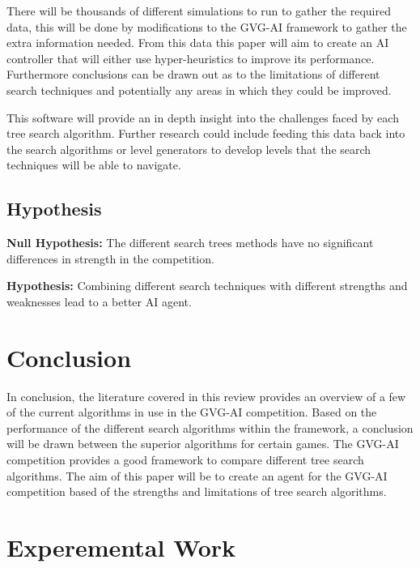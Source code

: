 \documentclass[journal]{IEEEtran}
\begin{document}
	There will be thousands of different simulations to run to gather the required data, this will be done by modifications to the GVG-AI framework to gather the extra information needed.
	From this data this paper will aim to create an AI controller that will either use hyper-heuristics to improve its performance. Furthermore conclusions can be drawn out as to the limitations of different search techniques and potentially any areas in which they could be improved.
	
	

	This software will provide an in depth insight into the challenges faced by each tree search algorithm.
	Further research could include feeding this data back into the search algorithms or level generators to develop levels that the search techniques will be able to navigate.

	
\subsection{Hypothesis}
	\textbf{Null Hypothesis:}
		The different search trees methods have no significant differences in strength in the competition.
		
	\textbf{Hypothesis:}
		Combining different search techniques with different strengths and weaknesses lead to a better AI agent.

\section{Conclusion}
	In conclusion, the literature covered in this review provides an overview of a few of the current algorithms in use in the GVG-AI competition.
	Based on the performance of the different search algorithms within the framework, a conclusion will be drawn between the superior algorithms for certain games.
	The GVG-AI competition provides a good framework to compare different tree search algorithms. 
	The aim of this paper will be to create an agent for the GVG-AI competition based of the strengths and limitations of tree search algorithms.








\section{Experemental Work}
\end{document}
